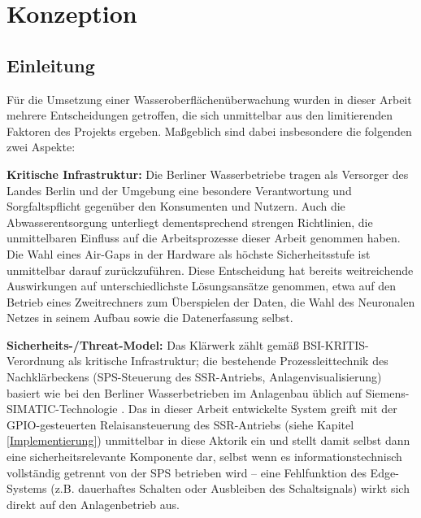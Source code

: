 
\chapter{Konzeption} \label{Konzept}

\section{Einleitung}

Für die Umsetzung einer Wasseroberflächenüberwachung wurden in dieser Arbeit mehrere Entscheidungen getroffen, die sich unmittelbar aus den limitierenden Faktoren des Projekts ergeben. Maßgeblich sind dabei insbesondere die folgenden zwei Aspekte:

\textbf{Kritische Infrastruktur:}
Die Berliner Wasserbetriebe tragen als Versorger des Landes Berlin und der Umgebung eine besondere Verantwortung und Sorgfaltspflicht gegenüber den Konsumenten und Nutzern. Auch die Abwasserentsorgung unterliegt dementsprechend strengen Richtlinien, die unmittelbaren Einfluss auf die Arbeitsprozesse dieser Arbeit genommen haben.
Die Wahl eines Air-Gaps in der Hardware als höchste Sicherheitsstufe ist unmittelbar darauf zurückzuführen. Diese Entscheidung hat bereits weitreichende Auswirkungen auf unterschiedlichste Lösungsansätze genommen, etwa auf den Betrieb eines Zweitrechners zum Überspielen der Daten, die Wahl des Neuronalen Netzes in seinem Aufbau sowie die Datenerfassung selbst.

\textbf{Sicherheits-/Threat-Model:}
Das Klärwerk zählt gemäß BSI-KRITIS-Verordnung als kritische Infrastruktur; die bestehende Prozessleittechnik des Nachklärbeckens (SPS-Steuerung des SSR-Antriebs, Anlagenvisualisierung) basiert wie bei den Berliner Wasserbetrieben im Anlagenbau üblich auf Siemens-SIMATIC-Technologie . Das in dieser Arbeit entwickelte System greift mit der GPIO-gesteuerten Relaisansteuerung des SSR-Antriebs (siehe Kapitel \ref{Implementierung}) unmittelbar in diese Aktorik ein und stellt damit selbst dann eine sicherheitsrelevante Komponente dar, selbst wenn es informationstechnisch vollständig getrennt von der SPS betrieben wird -- eine Fehlfunktion des Edge-Systems (z.B. dauerhaftes Schalten oder Ausbleiben des Schaltsignals) wirkt sich direkt auf den Anlagenbetrieb aus.

